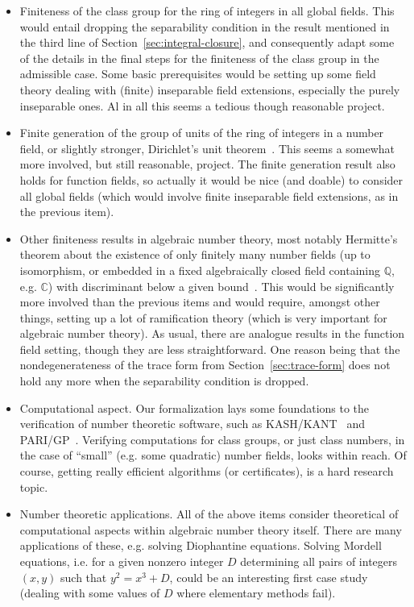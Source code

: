 \documentclass[a4paper,USenglish,cleveref, autoref, thm-restate]{lipics-v2021}
\newcommand{\C}{\mathbb{C}}
\newcommand{\Q}{\mathbb{Q}}
\begin{document}
\begin{itemize}
\item Finiteness of the class group for the ring of integers in all global fields. This would entail dropping the separability condition in the result mentioned in the third line of Section~\ref{sec:integral-closure}, and consequently adapt some of the details in the final steps for the finiteness of the class group in the admissible case. Some basic prerequisites would be setting up some field theory dealing with (finite) inseparable field extensions, especially the purely inseparable ones. 
Al in all this seems a tedious though reasonable project.
\item Finite generation of the group of units of the ring of integers in a number field, or slightly stronger, Dirichlet's unit theorem~\cite[Theorem 7.4]{Neukirch}. This seems a somewhat more involved, but still reasonable, project. The finite generation result also holds for function fields, so actually it would be nice (and doable) to consider all global fields (which would  involve finite inseparable field extensions, as in the previous item).
\item Other finiteness results in algebraic number theory, most notably Hermitte's theorem about the existence of only finitely many number fields (up to isomorphism, or embedded in a fixed algebraically closed field containing $\Q$, e.g. $\C$) with discriminant below a given bound~\cite[Theorem 2.16]{Neukirch}. This would be significantly more involved than the previous items and would require, amongst other things, setting up a lot of ramification theory (which is very important for algebraic number theory).
As usual, there are analogue results in the function field setting, though they are less straightforward. One reason being that the nondegenerateness of the trace form from Section~\ref{sec:trace-form} does not hold any more when the separability condition is dropped.
\item Computational aspect. Our formalization lays some foundations to the verification of number theoretic software,
such as KASH/KANT~\cite{kash} and PARI/GP~\cite{PARI2}. Verifying computations for class groups, or just class numbers, in the case of ``small'' (e.g. some quadratic) number fields, looks within reach. Of course, getting really efficient algorithms (or certificates), is a hard research topic. 
\item Number theoretic applications. All of the above items consider theoretical of computational aspects within algebraic number theory itself. There are many applications of these, e.g. solving Diophantine equations. Solving Mordell equations, i.e. for a given nonzero integer $D$ determining all pairs of integers $(x,y)$ such that $y^2=x^3+D$, could be an interesting first case study (dealing with some values of $D$ where elementary methods fail).
\end{itemize}
\end{document}

